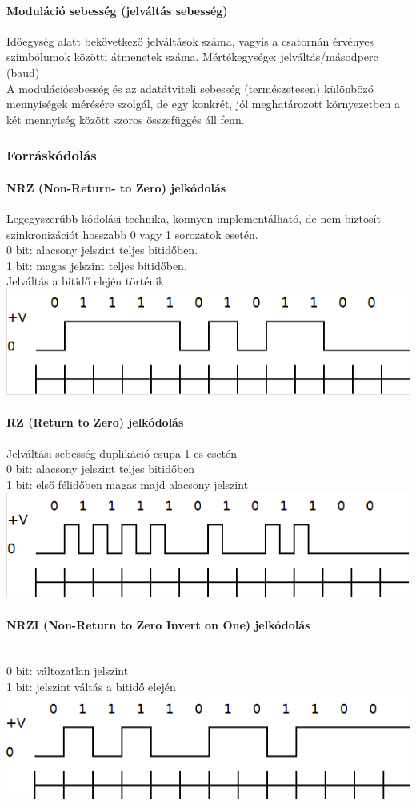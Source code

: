 \paragraph{Moduláció sebesség (jelváltás sebesség)} Időegység alatt bekövetkező jelváltások száma, vagyis a csatornán érvényes szimbólumok közötti átmenetek száma. Mértékegysége: jelváltás/másodperc (baud)\\
A modulációsebesség és az adatátviteli sebesség (természetesen) különböző mennyiségek mérésére szolgál, de egy konkrét, jól meghatározott környezetben a két mennyiség között szoros összefüggés áll fenn.

\subsubsection{Forráskódolás}
\paragraph{NRZ (Non-Return- to Zero) jelkódolás} Legegyszerűbb kódolási technika, könnyen implementálható, de nem biztosít szinkronizációt hosszabb 0 vagy 1 sorozatok esetén.\\
0 bit: alacsony jelszint teljes bitidőben.\\ 1 bit: magas jelszint teljes bitidőben.\\ Jelváltás a bitidő elején történik.
\includegraphics[width=0.35\linewidth]{fig/12-NRZ}

\paragraph{RZ (Return to Zero) jelkódolás} Jelváltási sebesség duplikáció csupa 1-es esetén\\
0 bit: alacsony jelszint teljes bitidőben\\
1 bit: első félidőben magas majd alacsony jelszint\\
\includegraphics[width=0.35\linewidth]{fig/12-RZ}

\paragraph{NRZI (Non-Return to Zero Invert on One) jelkódolás}~\\
0 bit: változatlan jelszint\\
1 bit: jelszint váltás a bitidő elején\\
\includegraphics[width=0.35\linewidth]{fig/12-NRZ1}

